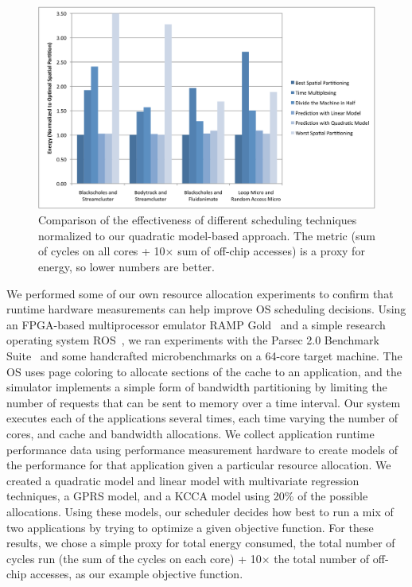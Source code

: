 \begin{figure}[tb]
  \begin{center}
    \includegraphics[width=\linewidth]{scheduling_results_energy.pdf}
  \end{center}
  \caption{Comparison of the effectiveness of different scheduling
    techniques normalized to our quadratic model-based approach.  The
    metric (sum of cycles on all cores + 10$\times$ sum of off-chip
    accesses) is a proxy for energy, so lower numbers are better.}
  \label{fig:scheduling_results}
\end{figure}


We performed some of our own resource allocation experiments to
confirm that runtime hardware measurements can help improve OS
scheduling decisions.  Using an FPGA-based multiprocessor emulator RAMP Gold~\cite{rampgold09, rampgold10, fame10} and
a simple research operating system ROS~\cite{ros, tess,tess_resource}, we ran experiments with the Parsec
2.0 Benchmark Suite~\cite{parsec} and some handcrafted
microbenchmarks on a 64-core target machine. The OS uses page coloring
to allocate sections of the cache to an application, and the simulator
implements a simple form of bandwidth partitioning by limiting the
number of requests that can be sent to memory over a time
interval. Our system executes each of the applications several times,
each time varying the number of cores, and cache and bandwidth
allocations.  We collect application runtime performance data using
performance measurement hardware to create models of the performance
for that application given a particular resource allocation.  We
created a quadratic model and linear model with multivariate
regression techniques, a GPRS model, and a KCCA model using 20\% of the possible allocations.  Using
these models, our scheduler decides how best to run a mix of two
applications by trying to optimize a given objective function.  For
these results, we chose a simple proxy for total energy consumed, the
total number of cycles run (the sum of the cycles on each core) +
10$\times$ the total number of off-chip accesses, as our example
objective function.


